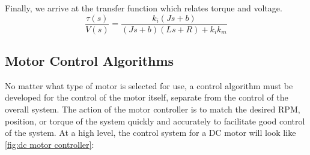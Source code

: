 Finally, we arrive at the transfer function which relates torque and voltage.
$$\frac{\tau(s)}{V(s)}=\frac{k_i(Js+b)}{(Js+b)(Ls+R)+k_ik_m}$$



\subsection{Motor Control Algorithms}
No matter what type of motor is selected for use, a control algorithm must be developed for the control of the motor itself, separate from the control of the overall system. The action of the motor controller is to match the desired RPM, position, or torque of the system quickly and accurately to facilitate good control of the system. At a high level, the control system for a DC motor will look like \autoref{fig:dc motor controller}:

